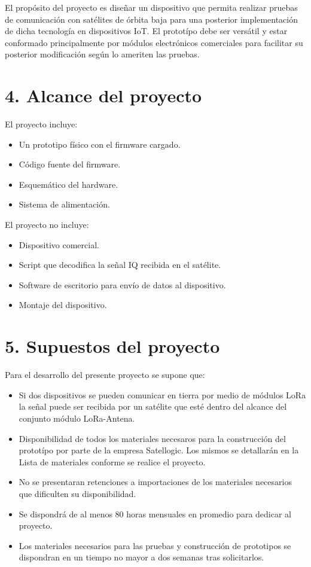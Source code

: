 \documentclass[
11pt, %
codirector, %
]{charter}
\begin{document}
El propósito del proyecto es diseñar un dispositivo que permita realizar pruebas de comunicación con satélites de órbita baja para una posterior implementación de dicha tecnología en dispositivos IoT. El prototípo debe ser versátil y estar conformado principalmente por módulos electrónicos comerciales para facilitar su posterior modificación según lo ameriten las pruebas.


\section{4. Alcance del proyecto}
\label{sec:alcance}

El proyecto incluye:
\begin{itemize}
	\item Un prototipo físico con el firmware cargado.
	\item Código fuente del firmware.
	\item Esquemático del hardware.
	\item Sistema de alimentación.
\end{itemize}
El proyecto no incluye:
\begin{itemize}
	\item Dispositivo comercial.
	\item Script que decodifica la señal IQ recibida en el satélite.
	\item Software de escritorio para envío de datos al dispositivo.
	\item Montaje del dispositivo.
\end{itemize}


\section{5. Supuestos del proyecto}
\label{sec:supuestos}

Para el desarrollo del presente proyecto se supone que:

\begin{itemize}
	\item Si dos dispositivos se pueden comunicar en tierra por medio de módulos LoRa la señal puede ser recibida por un satélite que esté dentro del alcance del conjunto módulo LoRa-Antena.
	\item Disponibilidad de todos los materiales necesaros para la construcción del prototípo por parte de la empresa Satellogic. Los mismos se detallarán en la Lista de materiales conforme se realice el proyecto.
	\item No se presentaran retenciones a importaciones de los materiales necesarios que dificulten su disponibilidad.
	\item Se dispondrá de al menos 80 horas mensuales en promedio para dedicar al proyecto.
	\item Los materiales necesarios para las pruebas y construcción de prototipos se dispondran en un tiempo no mayor a dos semanas tras solicitarlos.
\end{itemize}
\end{document}
